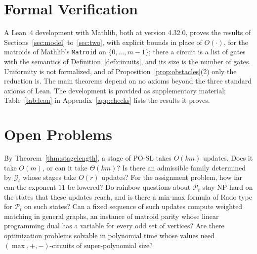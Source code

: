 \documentclass[runningheads,envcountsame]{llncs}
\newcommand{\Pos}{\mathcal P}
\newcommand{\leanartifact}{as supplementary material}
\begin{document}
\section{Formal Verification}
\label{sec:checks}

A Lean~4 development with Mathlib, both at version 4.32.0, proves the results of
Sections~\ref{sec:model} to~\ref{sec:two}, with explicit bounds in place of
$O(\cdot)$, for the matroids of Mathlib's \texttt{Matroid} on $\{0,\ldots,m-1\}$;
there a circuit is a list of gates with the semantics of
Definition~\ref{def:circuits}, and its size is the number of gates.  Uniformity is
not formalized, and of Proposition~\ref{prop:obstacles}(2) only the reduction is.  The
main theorems depend on no axioms beyond the
three standard axioms of Lean.  The development is provided \leanartifact;
Table~\ref{tab:lean} in Appendix~\ref{app:checks} lists the results it proves.

\section{Open Problems}
\label{sec:scope}

By Theorem~\ref{thm:stagelength}, a stage of PO-SL takes $O(km)$ updates.  Does
it take $O(m)$, or can it take $\Theta(km)$?  Is there an admissible family determined by
$\mathcal G_t$ whose stages take $O(r)$ updates?  For the assignment
problem, how far can the exponent $11$ be lowered?  Do rainbow questions about
$\Pos_t$ stay NP-hard on the states that these updates reach, and is there a
min-max formula of Rado type for $\Pos_t$ on such states?  Can a fixed sequence of such updates
compute weighted matching in general graphs, an instance of matroid parity whose
linear programming dual has a variable for every odd set of vertices?  Are there optimization problems solvable in
polynomial time whose values need $(\max,+,-)$-circuits of super-polynomial
size?




\clearpage
\appendix

\end{document}
